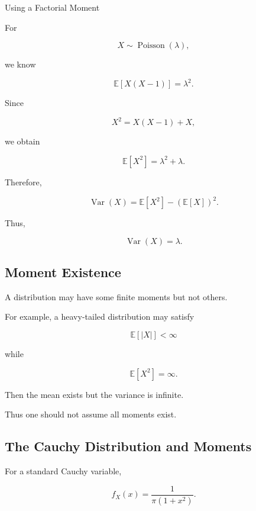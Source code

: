 \begin{workedexamplebox}{Using a Factorial Moment}

For

\[
X\sim\operatorname{Poisson}(\lambda),
\]

we know

\[
\mathbb{E}[X(X-1)]
=
\lambda^2.
\]

Since

\[
X^2
=
X(X-1)+X,
\]

we obtain

\[
\mathbb{E}[X^2]
=
\lambda^2+\lambda.
\]

Therefore,

\[
\operatorname{Var}(X)
=
\mathbb{E}[X^2]
-
(\mathbb{E}[X])^2.
\]

Thus,

\begin{answerbox}
\[
\boxed{
\operatorname{Var}(X)=\lambda.
}
\]
\end{answerbox}

\end{workedexamplebox}

\subsection{Moment Existence}
\label{subsec:moment-existence}

A distribution may have some finite moments but not others.

For example, a heavy-tailed distribution may satisfy

\[
\mathbb{E}[|X|]<\infty
\]

while

\[
\mathbb{E}[X^2]=\infty.
\]

Then the mean exists but the variance is infinite.

Thus one should not assume all moments exist.

\subsection{The Cauchy Distribution and Moments}
\label{subsec:cauchy-moments}

For a standard Cauchy variable,

\[
f_X(x)
=
\frac1{\pi(1+x^2)}.
\]

